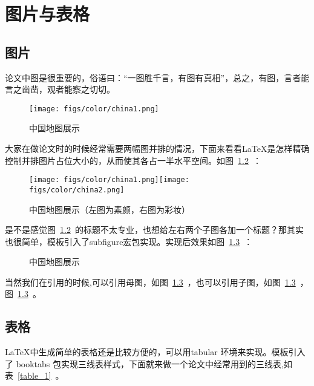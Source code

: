 \documentclass{NauThesis}
\begin{document}
\chapter{图片与表格}
\section{图片}
论文中图是很重要的，俗语曰：“一图胜千言，有图有真相”，总之，有图，言者能言之凿凿，观者能察之切切。

\begin{figure}[htbp]
    \centering
    \texttt{[image: figs/color/china1.png]}
    \caption{中国地图展示}
    \label{nuist_face}
\end{figure}


大家在做论文时的时候经常需要两幅图并排的情况，下面来看看\LaTeX 是怎样精确控制并排图片占位大小的，从而使其各占一半水平空间。如图~\ref{cn_map}~：

\begin{figure}[htbp!]
    \centering
    \texttt{[image: figs/color/china1.png]}\texttt{[image: figs/color/china2.png]}
    \caption{中国地图展示（左图为素颜，右图为彩妆）}
    \label{cn_map}
\end{figure}

是不是感觉图~\ref{cn_map}~的标题不太专业，也想给左右两个子图各加一个标题？那其实也很简单，模板引入了subfigure宏包实现。实现后效果如图~\ref{subfig_cn_map}~：

\begin{figure}[htbp!]
    \centering
    \caption{中国地图展示}
    \label{subfig_cn_map}
\end{figure}

当然我们在引用的时候,可以引用母图，如图~\ref{subfig_cn_map}~，也可以引用子图，如图~\ref{subfig_cn_map}~，图~\ref{subfig_cn_map}~。

\section{表格}

\LaTeX 中生成简单的表格还是比较方便的，可以用tabular 环境来实现。模板引入了 booktabs 包实现三线表样式，下面就来做一个论文中经常用到的三线表,如表~\ref{table_1}~。
\end{document}
